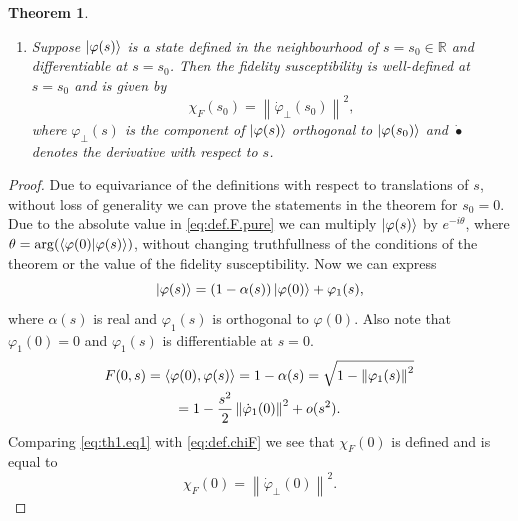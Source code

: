 \documentclass[american,aps,pra,reprint,floatfix,nofootinbib,superscriptaddress]{revtex4-2}
\newcommand{\norm}[1]{\left\|#1\right\|}
\newtheorem{theorem}{Theorem}
\begin{document}
\begin{theorem}
\begin{enumerate}
  \item Suppose $\ket{\varphi(s)}$ is a state defined in the neighbourhood of
  $s = s_0 \in \mathbb{R}$ and differentiable at $s=s_0$.
  Then the fidelity susceptibility is well-defined at $s=s_0$ and is given by
  \begin{equation}
    \chi_F(s_0) = \norm{\dot\varphi_\perp(s_0)}^2,
  \end{equation}
  where $\varphi_\perp(s)$ is the component of $\ket{\varphi(s)}$ orthogonal
  to $\ket{\varphi(s_0)}$ and $\dot\bullet$ denotes the derivative with respect
  to $s$.
\end{enumerate}
\end{theorem}
\begin{proof}
Due to equivariance of the definitions with respect to translations of $s$,
without loss of generality we can prove the statements in the theorem for
$s_0 = 0$. Due to the absolute value in \eqref{eq:def.F.pure} we can multiply
$\ket{\varphi(s)}$ by $e^{-i\theta}$,
where $\theta = \arg(\braket{\varphi(0)|\varphi(s)})$,
without changing truthfullness of the conditions of the theorem
or the value of the fidelity susceptibility. Now we can express
\begin{equation}
\ket{\varphi(s)} = (1 - \alpha(s)) \ket{\varphi(0)} + \varphi_1(s),
\end{equation}
where $\alpha(s)$ is real and $\varphi_1(s)$ is orthogonal to $\varphi(0)$.
Also note that $\varphi_1(0) = 0$ and $\varphi_1(s)$ is differentiable at $s=0$.
\begin{multline}
  \label{eq:th1.eq1}
  F(0, s) = \braket{\varphi(0), \varphi(s)} = 1 - \alpha(s)
  = \sqrt{1 - \norm{\varphi_1(s)}^2}\\
  = 1 - \frac{s^2}{2} \norm{\dot\varphi_1(0)}^2 + o(s^2).
\end{multline}
Comparing \eqref{eq:th1.eq1} with \eqref{eq:def.chiF} we see that
$\chi_F(0)$ is defined and is equal to
\begin{equation}
  \chi_F(0) = \norm{\dot\varphi_\perp(0)}^2.
\end{equation}


\end{proof}
\end{document}

